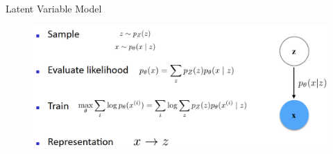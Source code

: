 \begin{frame}[allowframebreaks]{Latent Variable Model}
    \begin{figure}
        \centering
        \includegraphics[width=\linewidth]{images/vae/latent-variable-model.png}
    \end{figure}
\end{frame}
